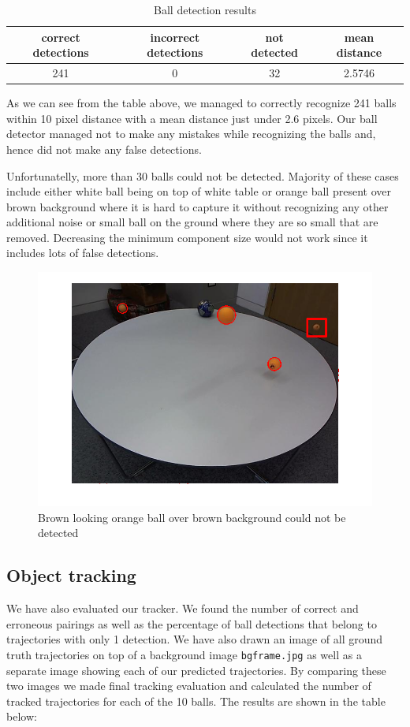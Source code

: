 \documentclass[12pt,a4paper]{article}
\begin{document}
\begin{table}[h]
\centering
\begin{tabular}{@{}cccc@{}}
\toprule
correct detections & incorrect detections & not detected & mean distance \\ \midrule
241                & 0                    & 32           & 2.5746        \\ \bottomrule
\end{tabular}
\caption{Ball detection results}
\label{my-label}
\end{table}

As we can see from the table above, we managed to correctly recognize 241 balls within 10 pixel distance with a mean distance just under 2.6 pixels. Our ball detector managed not to make any mistakes while recognizing the balls and, hence did not make any false detections.

Unfortunatelly, more than 30 balls could not be detected. Majority of these cases include either white ball being on top of white table or orange ball present over brown background where it is hard to capture it without recognizing any other additional noise or small ball on the ground where they are so small that are removed. Decreasing the minimum component size would not work since it includes lots of false detections. 

\begin{figure}
	\centering
    \includegraphics[width=140mm]{mistakes/frame_55_missed_ball.png}
    \caption{Brown looking orange ball over brown background could not be detected}
	\label{my-label06}
\end{figure} 

\subsection{Object tracking}
We have also evaluated our tracker. We found the number of correct and erroneous pairings as well as the percentage of ball detections that belong to trajectories with only 1 detection. We have also drawn an image of all ground truth trajectories on top of a background image \texttt{bgframe.jpg} as well as a separate image showing each of our predicted trajectories. By comparing these two images we made final tracking evaluation and calculated the number of tracked trajectories for each of the 10 balls. The results are shown in the table below:
\end{document}
